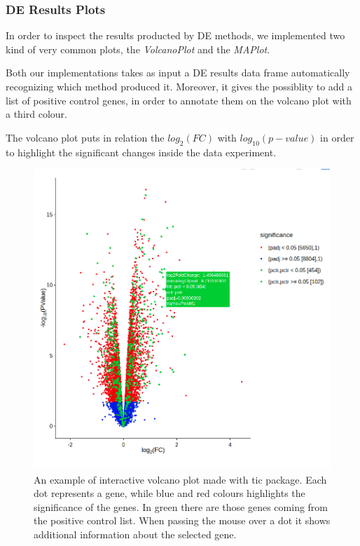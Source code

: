 \subsubsection{DE Results Plots}
In order to inspect the results producted by DE methods, we implemented two kind of very common plots, the \textit{VolcanoPlot} and the \textit{MAPlot}.

Both our implementations takes as input a DE results data frame automatically recognizing which method produced it.
Moreover, it gives the possiblity to add a list of positive control genes, in order to annotate them on the volcano plot with a third colour.

The volcano plot puts in relation the $log_2(FC)$ with $log_{10}(p-value)$ in order to highlight the significant changes inside the data experiment.

\begin{figure}[H]
\includegraphics[width=\textwidth,height=\textheight,keepaspectratio]{img/ticorser/volcano_example.png}
\caption[ticorser volcano]{An example of interactive volcano plot made with \gls{tic} package. Each dot represents a gene, while blue and red colours highlights the significance of the genes. In green there are those genes coming from the positive control list. When passing the mouse over a dot it shows additional information about the selected gene.}
\label{fig:ticorservolcano}
\centering
\end{figure}

